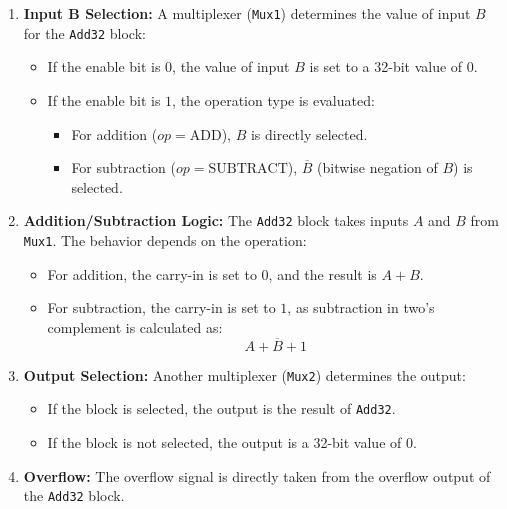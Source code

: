 \documentclass{article}
\begin{document}
\begin{enumerate}
    \item \textbf{Input B Selection:}  
    A multiplexer (\texttt{Mux1}) determines the value of input \( B \) for the \texttt{Add32} block:
    \begin{itemize}
        \item If the enable bit is \( 0 \), the value of input \( B \) is set to a 32-bit value of \( 0 \).
        \item If the enable bit is \( 1 \), the operation type is evaluated:
        \begin{itemize}
            \item For addition (\( op = \text{ADD} \)), \( B \) is directly selected.
            \item For subtraction (\( op = \text{SUBTRACT} \)), \( \overline{B} \) (bitwise negation of \( B \)) is selected.
        \end{itemize}
    \end{itemize}

    \item \textbf{Addition/Subtraction Logic:}  
    The \texttt{Add32} block takes inputs \( A \) and \( B \) from \texttt{Mux1}. The behavior depends on the operation:
    \begin{itemize}
        \item For addition, the carry-in is set to \( 0 \), and the result is \( A + B \).
        \item For subtraction, the carry-in is set to \( 1 \), as subtraction in two's complement is calculated as:
        \[
        A + \overline{B} + 1
        \]
    \end{itemize}

    \item \textbf{Output Selection:}  
    Another multiplexer (\texttt{Mux2}) determines the output:
    \begin{itemize}
        \item If the block is selected, the output is the result of \texttt{Add32}.
        \item If the block is not selected, the output is a 32-bit value of \( 0 \).
    \end{itemize}

    \item \textbf{Overflow:}  
    The overflow signal is directly taken from the overflow output of the \texttt{Add32} block.
\end{enumerate}
\end{document}
